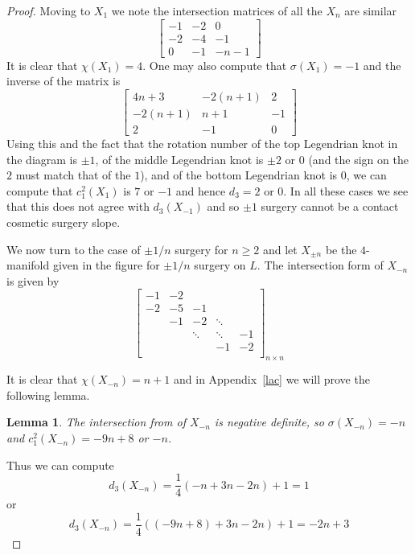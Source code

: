 \documentclass[12pt]{amsart}
\newtheorem{lemma}[theorem]{Lemma}
\theoremstyle{definition}
\theoremstyle{definition}
\begin{document}
\begin{proof}
			Moving to $X_1$ we note the intersection matrices of all the $X_n$ are similar 
			$$
			\begin{bmatrix}
				-1 & -2 &0\\
				-2 & -4 &-1\\
				0 & -1 &-n-1
			\end{bmatrix}
			$$
			It is clear that $\chi(X_{1})=4$. One may also compute that $\sigma(X_1)=-1$ and the inverse of the matrix is
			$$
			\begin{bmatrix}
				4n+3 & -2(n+1) &2\\
				-2(n+1) & n+1 &-1\\
				2 & -1 &0
			\end{bmatrix}
			$$
			Using this and the fact that the rotation number of the top Legendrian knot in the diagram is $\pm 1$, of the middle Legendrian knot is $\pm 2$ or $0$ (and the sign on the $2$ must match that of the $1$), and of the bottom Legendrian knot is $0$, we can compute that $c_1^2(X_1)$ is $7$ or $-1$ and hence $d_3= 2$ or $0$. In all these cases we see that this does not agree with $d_3(X_{-1})$ and so $\pm 1$ surgery cannot be a contact cosmetic surgery slope. 
			
			We now turn to the case of $\pm 1/n$ surgery for $n\geq 2$ and let $X_{\pm n}$ be the $4$-manifold given in the figure for $\pm 1/n$ surgery on $L$. The intersection form of $X_{-n}$ is given by 
			$$
			\begin{bmatrix}
				-1 & -2 & & &  \\
				-2 & -5 & -1 & &   \\
				& -1 & -2 & \ddots&    \\
				&  & \ddots & \ddots  &-1\\
				&&&-1 & -2   \\
			\end{bmatrix}_{n \times n}
			$$
			
			
			
			It is clear that $\chi(X_{-n})=n+1$ and in Appendix~\ref{lac} we will prove the following lemma.
			\begin{lemma}\label{tbm2computation}
				The intersection from of $X_{-n}$ is negative definite, so $\sigma(X_{-n})=-n$ and $c_1^2(X_{-n})=-9n+8$ or $-n$. 
			\end{lemma}
			Thus we can compute
			\[
			d_3(X_{-n})=\frac 14(-n+3n-2n)+1=1
			\]
			or 
			\[
			d_3(X_{-n})=\frac 14((-9n+8)+3n-2n)+1=-2n+3
			\]
			

\end{proof}
\end{document}
